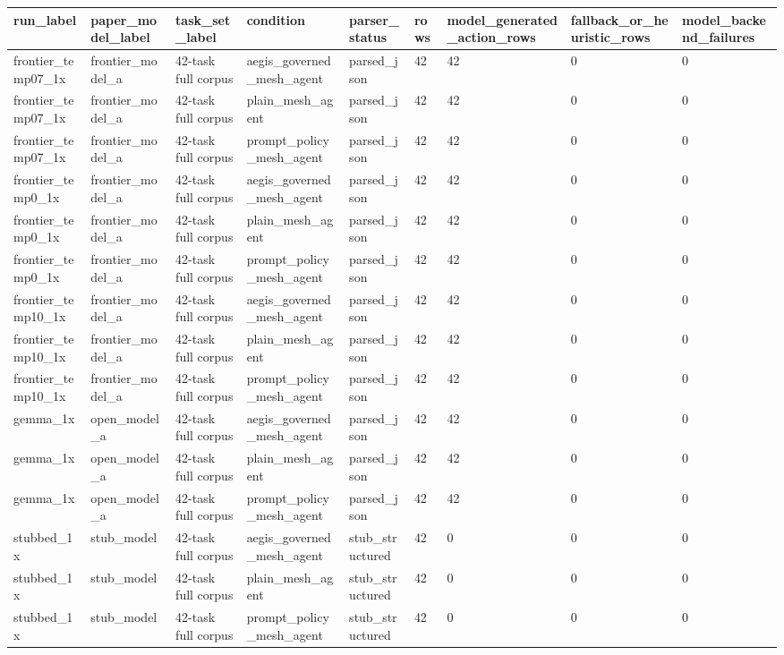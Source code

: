 \begin{tabular}{lllllllll}
 \hline
run\_label & paper\_model\_label & task\_set\_label & condition & parser\_status & rows & model\_generated\_action\_rows & fallback\_or\_heuristic\_rows & model\_backend\_failures \\
 \hline
frontier\_temp07\_1x & frontier\_model\_a & 42-task full corpus & aegis\_governed\_mesh\_agent & parsed\_json & 42 & 42 & 0 & 0 \\
frontier\_temp07\_1x & frontier\_model\_a & 42-task full corpus & plain\_mesh\_agent & parsed\_json & 42 & 42 & 0 & 0 \\
frontier\_temp07\_1x & frontier\_model\_a & 42-task full corpus & prompt\_policy\_mesh\_agent & parsed\_json & 42 & 42 & 0 & 0 \\
frontier\_temp0\_1x & frontier\_model\_a & 42-task full corpus & aegis\_governed\_mesh\_agent & parsed\_json & 42 & 42 & 0 & 0 \\
frontier\_temp0\_1x & frontier\_model\_a & 42-task full corpus & plain\_mesh\_agent & parsed\_json & 42 & 42 & 0 & 0 \\
frontier\_temp0\_1x & frontier\_model\_a & 42-task full corpus & prompt\_policy\_mesh\_agent & parsed\_json & 42 & 42 & 0 & 0 \\
frontier\_temp10\_1x & frontier\_model\_a & 42-task full corpus & aegis\_governed\_mesh\_agent & parsed\_json & 42 & 42 & 0 & 0 \\
frontier\_temp10\_1x & frontier\_model\_a & 42-task full corpus & plain\_mesh\_agent & parsed\_json & 42 & 42 & 0 & 0 \\
frontier\_temp10\_1x & frontier\_model\_a & 42-task full corpus & prompt\_policy\_mesh\_agent & parsed\_json & 42 & 42 & 0 & 0 \\
gemma\_1x & open\_model\_a & 42-task full corpus & aegis\_governed\_mesh\_agent & parsed\_json & 42 & 42 & 0 & 0 \\
gemma\_1x & open\_model\_a & 42-task full corpus & plain\_mesh\_agent & parsed\_json & 42 & 42 & 0 & 0 \\
gemma\_1x & open\_model\_a & 42-task full corpus & prompt\_policy\_mesh\_agent & parsed\_json & 42 & 42 & 0 & 0 \\
stubbed\_1x & stub\_model & 42-task full corpus & aegis\_governed\_mesh\_agent & stub\_structured & 42 & 0 & 0 & 0 \\
stubbed\_1x & stub\_model & 42-task full corpus & plain\_mesh\_agent & stub\_structured & 42 & 0 & 0 & 0 \\
stubbed\_1x & stub\_model & 42-task full corpus & prompt\_policy\_mesh\_agent & stub\_structured & 42 & 0 & 0 & 0 \\
 \hline
\end{tabular}
